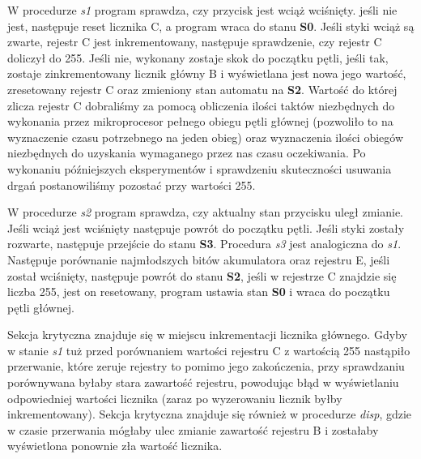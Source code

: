 \documentclass[fleqn]{article}
\begin{document}
W procedurze \textit{s1} program sprawdza, czy przycisk jest wciąż wciśnięty. jeśli nie jest, następuje reset licznika C, a program wraca do stanu \textbf{S0}. Jeśli styki wciąż są zwarte, rejestr C jest inkrementowany, następuje sprawdzenie, czy rejestr C doliczył do 255. Jeśli nie, wykonany zostaje skok do początku pętli, jeśli tak, zostaje zinkrementowany licznik główny B i wyświetlana jest nowa jego wartość, zresetowany rejestr C oraz zmieniony stan automatu na \textbf{S2}. Wartość do której zlicza rejestr C dobraliśmy za pomocą obliczenia ilości taktów niezbędnych do wykonania przez mikroprocesor pełnego obiegu pętli głównej (pozwoliło to na wyznaczenie czasu potrzebnego na jeden obieg) oraz wyznaczenia ilości obiegów niezbędnych do uzyskania wymaganego przez nas czasu oczekiwania. Po wykonaniu późniejszych eksperymentów i sprawdzeniu skuteczności usuwania drgań postanowiliśmy pozostać przy wartości 255.

W procedurze \textit{s2} program sprawdza, czy aktualny stan przycisku uległ zmianie. Jeśli wciąż jest wciśnięty następuje powrót do początku pętli. Jeśli styki zostały rozwarte, następuje przejście do stanu \textbf{S3}. Procedura \textit{s3} jest analogiczna do \textit{s1}. Następuje porównanie najmłodszych bitów akumulatora oraz rejestru E, jeśli został wciśnięty, następuje powrót do stanu \textbf{S2}, jeśli w rejestrze C znajdzie się liczba 255, jest on resetowany, program ustawia stan \textbf{S0} i wraca do początku pętli głównej.

Sekcja krytyczna znajduje się w miejscu inkrementacji licznika głównego. Gdyby w stanie \textit{s1} tuż przed porównaniem wartości rejestru C z wartością 255 nastąpiło przerwanie, które zeruje rejestry to pomimo jego zakończenia, przy sprawdzaniu porównywana byłaby stara zawartość rejestru, powodując błąd w wyświetlaniu odpowiedniej wartości licznika (zaraz po wyzerowaniu licznik byłby inkrementowany). Sekcja krytyczna znajduje się również w procedurze \textit{disp}, gdzie w czasie przerwania mógłaby ulec zmianie zawartość rejestru B i zostałaby wyświetlona ponownie zła wartość licznika.

\pagebreak

\noindent\begin{minipage}{.45\textwidth}
	
\end{minipage}\hfill
\noindent\begin{minipage}{.45\textwidth}
	
\end{minipage}\hfill
\end{document}
